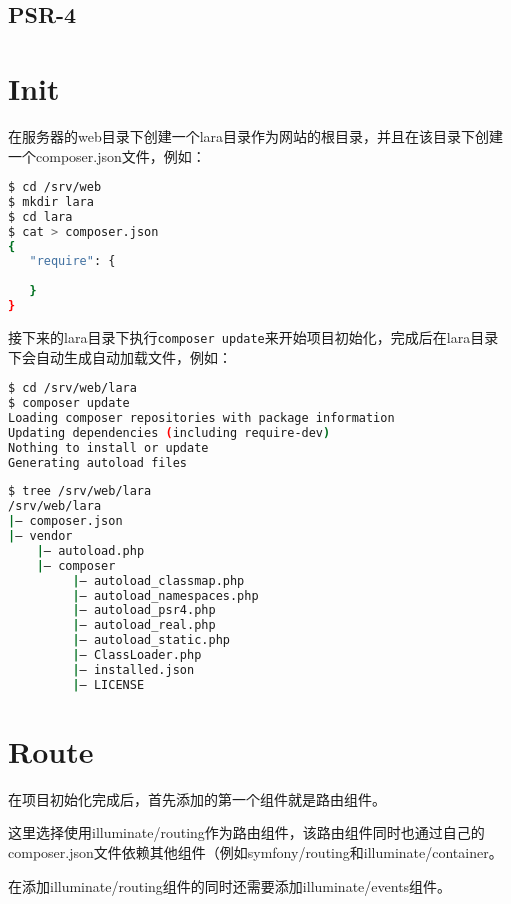 \subsection{PSR-4}



\section{Init}


在服务器的web目录下创建一个lara目录作为网站的根目录，并且在该目录下创建一个composer.json文件，例如：

\begin{lstlisting}[language=bash]
$ cd /srv/web
$ mkdir lara
$ cd lara
$ cat > composer.json
{
   "require": {
   
   }
}

\end{lstlisting}

接下来的lara目录下执行\texttt{composer update}来开始项目初始化，完成后在lara目录下会自动生成自动加载文件，例如：

\begin{lstlisting}[language=bash]
$ cd /srv/web/lara
$ composer update
Loading composer repositories with package information
Updating dependencies (including require-dev)
Nothing to install or update
Generating autoload files
\end{lstlisting}

\begin{lstlisting}[language=bash]
$ tree /srv/web/lara
/srv/web/lara
|— composer.json
|— vendor
    |— autoload.php
    |— composer
         |— autoload_classmap.php
         |— autoload_namespaces.php
         |— autoload_psr4.php
         |— autoload_real.php
         |— autoload_static.php
         |— ClassLoader.php
         |— installed.json
         |— LICENSE
\end{lstlisting}





\section{Route}

在项目初始化完成后，首先添加的第一个组件就是路由组件。

这里选择使用illuminate/routing作为路由组件，该路由组件同时也通过自己的composer.json文件依赖其他组件（例如symfony/routing和illuminate/container。

在添加illuminate/routing组件的同时还需要添加illuminate/events组件。


